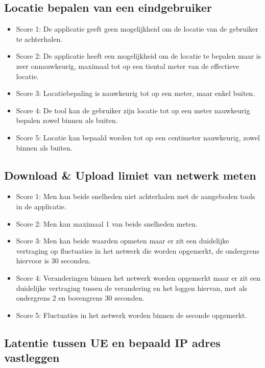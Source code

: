 \subsection{Locatie bepalen van een eindgebruiker}

\begin{itemize}
    \item Score 1: De applicatie geeft geen mogelijkheid om de locatie van de gebruiker te achterhalen.
    \item Score 2: De applicatie heeft een mogelijkheid om de locatie te bepalen maar is zeer onnauwkeurig, maximaal tot op een tiental meter van de effectieve locatie.
    \item Score 3: Locatiebepaling is nauwkeurig tot op een meter, maar enkel buiten.
    \item Score 4: De tool kan de gebruiker zijn locatie tot op een meter nauwkeurig bepalen zowel binnen als buiten.
    \item Score 5: Locatie kan bepaald worden tot op een centimeter nauwkeurig, zowel binnen als buiten.
\end{itemize}

\subsection{Download \& Upload limiet van netwerk meten}

\begin{itemize}
    \item Score 1: Men kan beide snelheden niet achterhalen met de aangeboden tools in de applicatie.
    \item Score 2: Men kan maximaal 1 van beide snelheden meten.
    \item Score 3: Men kan beide waarden opmeten maar er zit een duidelijke vertraging op fluctuaties in het netwerk die worden opgemerkt, de ondergrens hiervoor is 30 seconden.
    \item Score 4: Veranderingen binnen het netwerk worden opgemerkt maar er zit een duidelijke vertraging tussen de verandering en het loggen hiervan, met als ondergrens 2 en bovengrens 30 seconden.
    \item Score 5: Fluctuaties in het netwerk worden binnen de seconde opgemerkt.
\end{itemize}

\subsection{Latentie tussen UE en bepaald IP adres vastleggen}

